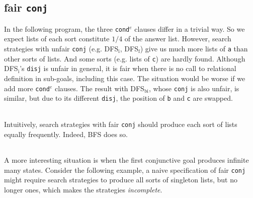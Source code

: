\documentclass[format=acmlarge, review=true, authordraft=true]{acmart}
\newcommand{\conde}{\texttt{cond$^e$} }
\newcommand{\conj}{\texttt{conj}}
\newcommand{\disj}{\texttt{disj}}
\begin{document}
\begin{center}
	\begin{tabular}{c}
		
	\end{tabular}
\end{center}

\subsection{fair \texttt{conj}}

In the following program, the three \conde clauses differ in a trivial way. So 
we expect lists of each sort constitute $1/4$ of the answer list. However, 
search strategies with unfair \conj{} (e.g. DFS$_\textrm{i}$, DFS$_\textrm{f}$) give us much 
more lists of \texttt{a} than other sorts of lists. And some sorts (e.g. lists 
of \texttt{c}) are hardly found. Although DFS$_\textrm{i}$'s \disj{} is unfair in general, 
it is fair when there is no call to relational definition in sub-goals, 
including this case. The situation would be worse if we add more \conde 
clauses. The result with DFS$_\textrm{bi}$, whose \conj{} is also unfair, is similar, but 
due to its different \disj{}, the position of \texttt{b} and \texttt{c} are 
swapped. 

\begin{center}
	\begin{tabular}{c}
		
	\end{tabular}
\end{center}

Intuitively, search strategies with fair \conj{} should produce each sort of 
lists equally frequently. Indeed, BFS does so.

\begin{center}
	\begin{tabular}{c}
		
	\end{tabular}
\end{center}

A more interesting situation is when the first conjunctive goal produces 
infinite many states. Consider the following example, a naive specification of 
fair \conj{} might require search strategies to produce all sorts of singleton 
lists, but no longer ones, which makes the strategies \emph{incomplete}. 

\begin{center}
	\begin{tabular}{c}
		
	\end{tabular}
\end{center}
\end{document}
